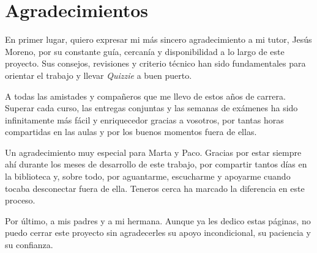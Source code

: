 \chapter*{Agradecimientos}

En primer lugar, quiero expresar mi más sincero agradecimiento a mi tutor, Jesús Moreno, por su constante guía, cercanía y disponibilidad a lo largo de este proyecto. Sus consejos, revisiones y criterio técnico han sido fundamentales para orientar el trabajo y llevar \textit{Quizzie} a buen puerto.

A todas las amistades y compañeros que me llevo de estos años de carrera. Superar cada curso, las entregas conjuntas y las semanas de exámenes ha sido infinitamente más fácil y enriquecedor gracias a vosotros, por tantas horas compartidas en las aulas y por los buenos momentos fuera de ellas.

Un agradecimiento muy especial para Marta y Paco. Gracias por estar siempre ahí durante los meses de desarrollo de este trabajo, por compartir tantos días en la biblioteca y, sobre todo, por aguantarme, escucharme y apoyarme cuando tocaba desconectar fuera de ella. Teneros cerca ha marcado la diferencia en este proceso.

Por último, a mis padres y a mi hermana. Aunque ya les dedico estas páginas, no puedo cerrar este proyecto sin agradecerles su apoyo incondicional, su paciencia y su confianza.
